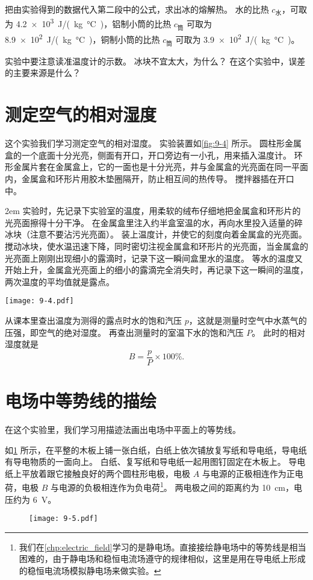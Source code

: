 把由实验得到的数据代入第二段中的公式，求出冰的熔解热。
水的比热 $c_{\text{水}}$，可取为 \qty{4.2e3}{J/(kg.\celsius)}，铝制小筒的比热 $c_{\text{筒}}$ 可取为 \qty{8.9e2}{J/(kg.\celsius)}，铜制小筒的比热 $c_{\text{筒}}$ 可取为 \qty{3.9e2}{J/(kg.\celsius)}。

实验中要注意读准温度计的示数。
冰块不宜太大，为什么？
在这个实验中，误差的主要来源是什么？

\section{测定空气的相对湿度}
这个实验我们学习测定空气的相对湿度。
实验装置如\cref{fig:9-4} 所示。
圆柱形金属盒的一个底面十分光亮，侧面有开口，开口旁边有一小孔，用来插入温度计。
环形金属片套在金属盒上，它的一面也是十分光亮，井与金属盒的光亮面在同一平面内，金属盒和环形片用胶木垫圈隔开，防止相互间的热传导。
搅拌器插在开口中。

\medskip\noindent
\begin{minipage}{0.6\linewidth}\parindent2em
实验时，先记录下实验室的温度，用柔软的绒布仔细地把金属盒和环形片的光亮面擦得十分干净。
在金属盒里注入约半盒室温的水，再向水里投入适量的碎冰块（注意不要沾污光亮面）。
装上温度计，并使它的刻度向着金属盒的光亮面。
搅动冰块，使水温迅速下降，同时密切注视金属盒和环形片的光亮面，当金属盒的光亮面上刚刚出现细小的露滴时，记录下这一瞬间盒里水的温度。
等水的温度又开始上升，金属盒光亮面上的细小的露滴完全消失时，再记录下这一瞬间的温度，两次温度的平均值就是露点。
\end{minipage}\hfill
\begin{minipage}{0.35\linewidth}\centering
  \begin{figurehere}
    \texttt{[image: 9-4.pdf]}
    \caption{}\label{fig:9-4}
  \end{figurehere}
\end{minipage}

\medskip
从课本里查出温度为测得的露点时水的饱和汽压 $p$，这就是测量时空气中水蒸气的压强，即空气的绝对湿度。
再查出测量时的室温下水的饱和汽压 $P$。
此时的相对湿度就是
\[B=\frac{p}{P}\times 100\%.\]

\section{电场中等势线的描绘}
在这个实验里，我们学习用描迹法画出电场中平面上的等势线。

如\cref{fig:9-5} 所示，在平整的木板上铺一张白纸，白纸上依次铺放复写纸和导电纸，导电纸有导电物质的一面向上。
白纸、复写纸和导电纸一起用图钉固定在木板上。
导电纸上平放着跟它接触良好的两个圆柱形电极，电极 $A$ 与电源的正极相连作为正电荷，电极 $B$ 与电源的负极相连作为负电荷\footnote{我们在\cref{chp:electric_field}学习的是静电场。直接接绘静电场中的等势线是相当困难的，由于静电场和稳恒电流场遵守的规律相似，这里是用在导电纸上形成的稳恒电流场模拟静电场来做实验。}。
两电极之间的距离约为 \qty{10}{cm}，电压约为 \qty{6}{V}。
\begin{figure}
  \texttt{[image: 9-5.pdf]}
  \caption{}\label{fig:9-5}
\end{figure}

